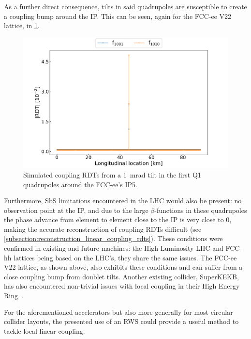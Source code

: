As a further direct consequence, tilts in said quadrupoles are susceptible to create a coupling bump around the IP.
This can be seen, again for the FCC-ee V\num{22} lattice, in \cref{figure:fccee_ip5_coupling_bump}.

\begin{figure}[!htb]
    \centering
    \includegraphics*[width=\textwidth]{Figures/IR_Coupling_Correction/fccee_ip5_coupling_bump.pdf}
    \caption{Simulated coupling RDTs from a \qty{1}{\milli\radian} tilt in the first Q\num{1} quadrupoles around the FCC-ee's IP\num{5}.}
    \label{figure:fccee_ip5_coupling_bump}
\end{figure}

Furthermore, SbS limitations encountered in the LHC would also be present: no observation point at the IP, and due to the large \(\beta\)-functions in these quadrupoles the phase advance from element to element close to the IP is very close to \num{0}, making the accurate reconstruction of coupling RDTs difficult (see \cref{subsection:reconstruction_linear_coupling_rdts}).
These conditions were confirmed in existing and future machines: the High Luminosity LHC and FCC-hh lattices being based on the LHC's, they share the same issues.
The FCC-ee V\num{22} lattice, as shown above, also exhibits these conditions and can suffer from a close coupling bump from doublet tilts.
Another existing collider, SuperKEKB, has also encountered non-trivial issues with local coupling in their High Energy Ring~\cite{ICFA:Morita:Optics_Corrections_including_IP_Local_Coupling_at_SuperKEKB}.

For the aforementioned accelerators but also more generally for most circular collider layouts, the presented use of an RWS could provide a useful method to tackle local linear coupling.

